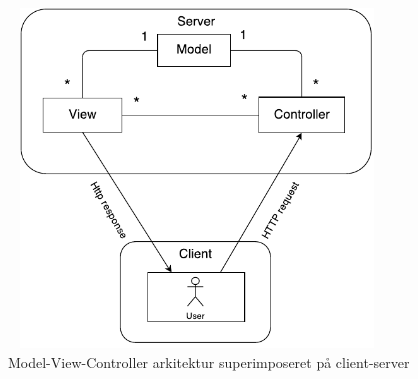 \documentclass[12pt]{article}   %
\begin{document}
\begin{figure}[!ht]
	\centering
\includegraphics[width=10cm, height=9cm]{mvc.pdf}
\caption{Model-View-Controller arkitektur superimposeret på client-server}
\label{fig:mvc}
\end{figure}
\end{document}
